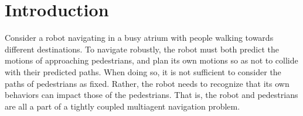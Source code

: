 \documentclass[conference]{IEEEtran}
\begin{document}
\IEEEpeerreviewmaketitle


\vspace{-0.2em}
\section{Introduction}
\vspace{-0.2em}
\label{sec:intro}
\noindent
Consider a robot navigating in a busy atrium with people walking
towards different destinations. 
To navigate robustly, the robot must both predict the motions of approaching pedestrians, and plan its own motions so as not to collide with their predicted paths.
When doing so, it is not sufficient to consider the paths of pedestrians as 
fixed.  Rather, the robot needs to recognize that its own behaviors can 
impact those of the pedestrians. That is, the robot and pedestrians are all a 
part of a tightly coupled multiagent navigation 
problem. 



\end{document}
